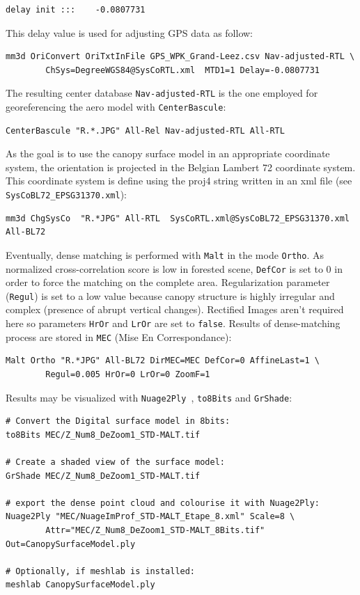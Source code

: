 \begin{verbatim}
delay init :::    -0.0807731
\end{verbatim}

This delay value is used for adjusting GPS data as follow:

\begin{verbatim}
mm3d OriConvert OriTxtInFile GPS_WPK_Grand-Leez.csv Nav-adjusted-RTL \
        ChSys=DegreeWGS84@SysCoRTL.xml 	MTD1=1 Delay=-0.0807731
\end{verbatim}

The resulting center database {\tt Nav-adjusted-RTL} is the one employed for georeferencing the aero model with { \tt CenterBascule}:

\begin{verbatim}
CenterBascule "R.*.JPG" All-Rel Nav-adjusted-RTL All-RTL
\end{verbatim}

As the goal is to use the canopy surface model in an appropriate coordinate system, the orientation is projected in the Belgian Lambert 72 coordinate system. This coordinate system is define using the proj4 string written in an xml file (see {\tt SysCoBL72\_EPSG31370.xml}):

\begin{verbatim}
mm3d ChgSysCo  "R.*JPG" All-RTL  SysCoRTL.xml@SysCoBL72_EPSG31370.xml   All-BL72
\end{verbatim}

Eventually, dense matching is performed with {\tt Malt} in the mode {\tt Ortho}. As normalized cross-correlation score is low in forested scene, {\tt DefCor} is set to $0$ in order to force the matching on the complete area. Regularization parameter ({\tt Regul}) is set to a low value because canopy structure is highly irregular and complex (presence of abrupt vertical changes). Rectified Images aren't required here so parameters {\tt HrOr} and {\tt LrOr} are set to {\tt false}. Results of dense-matching process are stored in {\tt MEC} (Mise En Correspondance):
\begin{verbatim}
Malt Ortho "R.*JPG" All-BL72 DirMEC=MEC DefCor=0 AffineLast=1 \
        Regul=0.005 HrOr=0 LrOr=0 ZoomF=1
\end{verbatim}

Results may be visualized with {\tt Nuage2Ply },  {\tt to8Bits} and {\tt GrShade}:

\begin{verbatim}
# Convert the Digital surface model in 8bits:
to8Bits MEC/Z_Num8_DeZoom1_STD-MALT.tif

# Create a shaded view of the surface model:
GrShade MEC/Z_Num8_DeZoom1_STD-MALT.tif

# export the dense point cloud and colourise it with Nuage2Ply:
Nuage2Ply "MEC/NuageImProf_STD-MALT_Etape_8.xml" Scale=8 \
        Attr="MEC/Z_Num8_DeZoom1_STD-MALT_8Bits.tif" Out=CanopySurfaceModel.ply

# Optionally, if meshlab is installed:
meshlab CanopySurfaceModel.ply
\end{verbatim}

